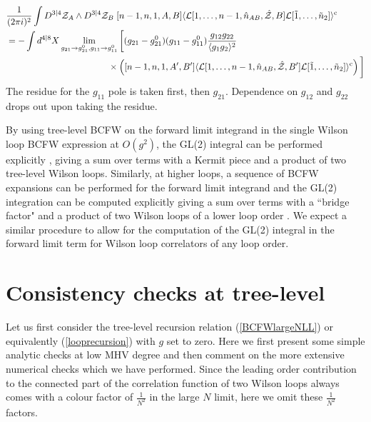 \documentclass[12pt]{article}
\numberwithin{equation}{section}
\begin{document}
\begin{align}
    & \frac{1}{(2 \pi i)^2} \int D^{3|4}\mathcal{Z}_A \wedge D^{3|4}\mathcal{Z}_B \hspace{1mm}[n-1,n,1,A,B] \langle \mathcal{L}[1,\ldots,n-1,\hat{n}_{AB},\hat{\mathcal{Z}},B] \mathcal{L}[\tilde{1},\ldots,\tilde{n}_2]\rangle^{\rm c}\notag\\
    &=- \int d^{4|8}X \lim_{g_{21}\rightarrow g_{21}^0,g_{11}\rightarrow g_{11}^0}\bigg[(g_{21}-g_{21}^0)(g_{11}-g_{11}^0)\frac{g_{12}g_{22}}{\langle g_1 g_2 \rangle^2}\notag\\
    &\hspace{40mm}\times\left([n-1,n,1,A',B'] \langle \mathcal{L}[1,\ldots,n-1,\hat{n}_{AB},\hat{\mathcal{Z}},B'] \mathcal{L}[\tilde{1},\ldots,\tilde{n}_2]\rangle^{\rm c}\right)\bigg]
\end{align}
The residue for the $g_{11}$ pole is taken first, then $g_{21}$. Dependence on $g_{12}$ and $g_{22}$ drops out upon taking the residue.

By using tree-level BCFW on the forward limit integrand in the single Wilson loop BCFW expression at $O(g^2)$, the GL(2) integral can be performed explicitly \cite{Bourjaily:2013mma}, giving a sum over terms with a Kermit piece and a product of two tree-level Wilson loops. Similarly, at higher loops, a sequence of BCFW expansions can be performed for the forward limit integrand and the GL(2) integration can be computed explicitly giving a sum over terms with a ``bridge factor" and a product of two Wilson loops of a lower loop order \cite{Bourjaily:2023apy}. We expect a similar procedure to allow for the computation of the GL(2) integral in the forward limit term for Wilson loop correlators of any loop order.


\section{Consistency checks at tree-level}
Let us first consider the tree-level recursion relation (\ref{BCFWlargeNLL}) or equivalently (\ref{looprecursion}) with $g$ set to zero. Here we first present some simple analytic checks at low MHV degree and then comment on the more extensive numerical checks which we have performed. Since the leading order contribution to the connected part of the correlation function of two Wilson loops always comes with a colour factor of \(\frac{1}{N^2}\) in the large \(N\) limit, here we omit these \(\frac{1}{N^2}\) factors.
\end{document}
